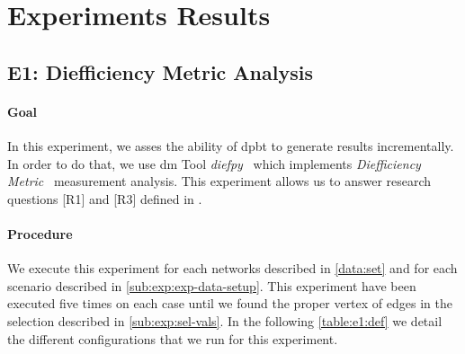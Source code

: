 \section{Experiments Results}\label{sec:exp:observed-results}
\subsection{E1: Diefficiency Metric Analysis}\label{sub:sec:exp-1} 
\paragraph{Goal} In this experiment, we asses the ability of \acrshort{dpbt} to generate results incrementally.
In order to do that, we use \acrfull{dm} Tool \emph{diefpy}~\cite{diefpy} which implements \emph{Diefficiency Metric}~\cite{diefpaper} measurement analysis.
This experiment allows us to answer research questions [R1] and [R3] defined in . 

\paragraph{Procedure} We execute this experiment for each networks described in \autoref{data:set} and for each scenario described in \autoref{sub:exp:exp-data-setup}.
This experiment have been executed five times on each case until we found the proper vertex of edges in the selection described in \autoref{sub:exp:sel-vals}.
In the following \autoref{table:e1:def} we detail the different configurations that we run for this experiment.

